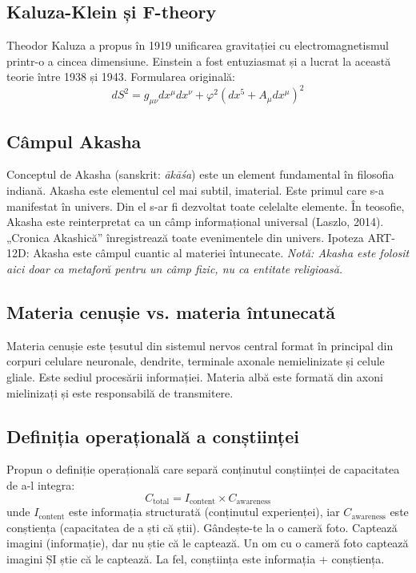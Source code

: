 \documentclass[11pt,a4paper]{article}
\begin{document}
\subsection{Kaluza-Klein și F-theory}
Theodor Kaluza a propus în 1919 unificarea gravitației cu electromagnetismul printr-o a cincea dimensiune. Einstein a fost entuziasmat și a lucrat la această teorie între 1938 și 1943. Formularea originală:
\begin{equation}
dS^2 = g_{\mu\nu} dx^\mu dx^\nu + \varphi^2(dx^5 + A_{\mu} dx^\mu)^2
\end{equation}

\subsection{Câmpul Akasha}
Conceptul de Akasha (sanskrit: \emph{ākāśa}) este un element fundamental în filosofia indiană. Akasha este elementul cel mai subtil, imaterial. Este primul care s-a manifestat în univers. Din el s-ar fi dezvoltat toate celelalte elemente. În teosofie, Akasha este reinterpretat ca un câmp informațional universal (Laszlo, 2014). „Cronica Akashică” înregistrează toate evenimentele din univers. Ipoteza ART-12D: Akasha este câmpul cuantic al materiei întunecate. \textit{Notă: Akasha este folosit aici doar ca metaforă pentru un câmp fizic, nu ca entitate religioasă.}

\subsection{Materia cenușie vs. materia întunecată}
Materia cenușie este țesutul din sistemul nervos central format în principal din corpuri celulare neuronale, dendrite, terminale axonale nemielinizate și celule gliale. Este sediul procesării informației. Materia albă este formată din axoni mielinizați și este responsabilă de transmitere.

\subsection{Definiția operațională a conștiinței}
Propun o definiție operațională care separă conținutul conștiinței de capacitatea de a-l integra:
\begin{equation}
C_{\text{total}} = I_{\text{content}} \times C_{\text{awareness}}
\end{equation}
unde $I_{\text{content}}$ este informația structurată (conținutul experienței), iar $C_{\text{awareness}}$ este conștiența (capacitatea de a ști că știi). Gândește-te la o cameră foto. Captează imagini (informație), dar nu știe că le captează. Un om cu o cameră foto captează imagini ȘI știe că le captează. La fel, conștiința este informația + conștiența.
\end{document}
